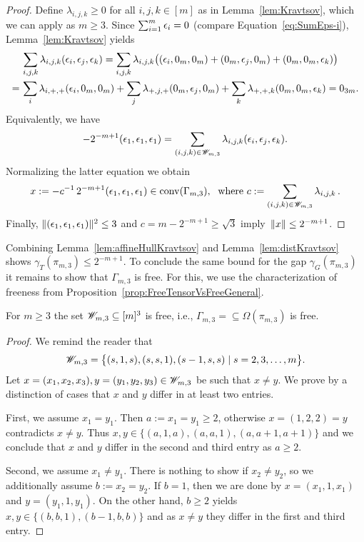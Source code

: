\begin{proof}
	Define $\lambda_{i,j,k} \geq 0$ for all $i,j,k \in [m]$ as in Lemma~\ref{lem:Kravtsov}, which we can apply as $m \geq 3$. Since $\sum_{i = 1}^m \epsilon_i = 0$ (compare Equation~\eqref{eq:SumEps-i}), Lemma~\ref{lem:Kravtsov} yields
	\begin{align*}
		&\sum_{i,j,k} \lambda_{i,j,k} (\epsilon_i,\epsilon_j,\epsilon_k)
		= \sum_{i,j,k} \lambda_{i,j,k} \big( (\epsilon_i, 0_m, 0_m) + (0_m, \epsilon_j, 0_m) + (0_m, 0_m, \epsilon_k) \big) \\
		= \, &\sum_i \lambda_{i,+,+} (\epsilon_i, 0_m, 0_m) + \sum_j \lambda_{+,j,+} (0_m, \epsilon_j, 0_m) + \sum_k \lambda_{+,+,k} (0_m, 0_m, \epsilon_k)
		= 0_{3m}.
	\end{align*}
	Equivalently, we have 
		\[ -2^{-m+1}(\epsilon_1,\epsilon_1,\epsilon_1) = \sum_{(i,j,k) \in \mathscr{W}_{m,3}} \lambda_{i,j,k}(\epsilon_i,\epsilon_j,\epsilon_k). \]
	Normalizing the latter equation we obtain 
	\begin{align*}
		x := - c^{-1} \, 2^{-m+1} (\epsilon_1,\epsilon_1,\epsilon_1) \in \operatorname{conv}(\Gamma_{m,3}), \;
		\text{ where } c := \sum_{(i,j,k)\in \mathscr{W}_{m,3}} \lambda_{i,j,k} \, .
	\end{align*}
	Finally, $\lVert(\epsilon_1, \epsilon_1, \epsilon_1)\rVert^2 \leq 3$ and $c = m-2^{-m+1} \geq \sqrt{3}$ imply $\,\lVert x\rVert \leq 2^{-m+1}$.
\end{proof}

Combining Lemma~\ref{lem:affineHullKravtsov} and Lemma~\ref{lem:distKravtsov} shows $\gamma_T(\pi_{m,3}) \leq 2^{-m+1}$.
To conclude the same bound for the gap $\gamma_G(\pi_{m,3})$ it remains to show that $\Gamma_{m,3}$ is free. For this, we use the characterization of freeness from Proposition~\ref{prop:FreeTensorVsFreeGeneral}.

\begin{prop}\label{prop:WnFree}
	For $m \geq 3$ the set $\mathscr{W}_{m,3} \subseteq [m]^3$ is free, i.e., $\Gamma_{m,3} =  \subseteq \Omega(\pi_{m,3})$ is free. 
\end{prop}

\begin{proof}
	We remind the reader that
	\[ \mathscr{W}_{m,3} = \big\lbrace (s,1,s), (s,s,1), (s-1,s,s) \mid s=2,3,\ldots,m \big\rbrace. \]
	Let $x = (x_1, x_2, x_3), y = (y_1, y_2, y_3) \in \mathscr{W}_{m,3}$ be such that $x \neq y$. We prove by a distinction of cases that $x$ and $y$ differ in at least two entries.
	
	First, we assume $x_1 = y_1$. Then $a := x_1 = y_1 \geq 2$, otherwise $x = (1, 2, 2) = y$ contradicts $x \neq y$. Thus $x,y \in \lbrace (a, 1, a), (a, a, 1), (a, a+1, a+1) \rbrace$ and we conclude that $x$ and $y$ differ in the second and third entry as $a \geq 2$.
	
	Second, we assume $x_1 \neq y_1$. There is nothing to show if $x_2 \neq y_2$, so we additionally assume $b := x_2 = y_2$. If $b=1$, then we are done by $x = (x_1, 1, x_1)$ and $y = (y_1, 1, y_1)$. On the other hand, $b \geq 2$ yields $x, y \in \lbrace (b, b, 1), (b-1, b, b) \rbrace$ and as $x \neq y$ they differ in the first and third entry.
\end{proof}




